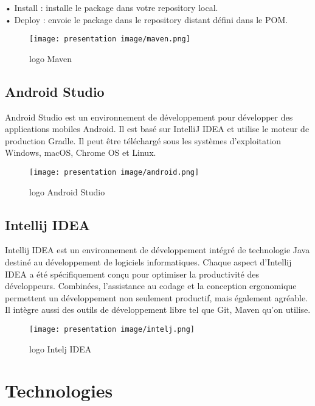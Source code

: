 • Install : installe le package dans votre repository local.\\

• Deploy : envoie le package dans le repository distant défini dans le POM.\\

\begin{figure}[!h]
\begin{center}
\texttt{[image: presentation image/maven.png]}
\end{center}
\caption{logo Maven}
\end{figure}

\subsection{Android Studio}
Android Studio est un environnement de développement pour développer des applications mobiles Android. Il est basé sur IntelliJ IDEA et utilise le moteur de production Gradle. Il peut être téléchargé sous les systèmes d'exploitation Windows, macOS, Chrome OS et Linux.
\newpage

\begin{figure}[!h]
\begin{center}
\texttt{[image: presentation image/android.png]}
\end{center}
\caption{logo Android Studio}
\end{figure}

\subsection{Intellij IDEA}
Intellij IDEA est un environnement de développement intégré de technologie Java destiné au développement de logiciels informatiques.
Chaque aspect d'Intellij IDEA a été spécifiquement conçu pour optimiser la productivité des développeurs. Combinées, l'assistance au codage et la conception ergonomique permettent un développement non seulement productif, mais également agréable. Il intègre aussi des outils de développement libre tel que Git, Maven qu’on utilise.
\begin{figure}[!h]
\begin{center}
\texttt{[image: presentation image/intelj.png]}
\end{center}
\caption{logo Intelj IDEA}
\end{figure}

\section{Technologies}
